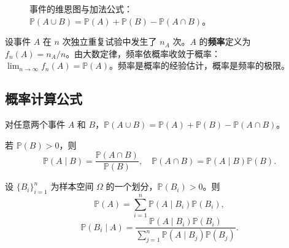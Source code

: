 \begin{figure}[htbp]
\centering
{}
\caption{事件的维恩图与加法公式：$\mathbb{P}(A\cup B)=\mathbb{P}(A)+\mathbb{P}(B)-\mathbb{P}(A\cap B)$。}
\label{fig:venn_diagram}
\end{figure}

\begin{definition}[频率与概率的关系]\label{def:frequency_probability}
设事件 $A$ 在 $n$ 次独立重复试验中发生了 $n_A$ 次。$A$ 的\textbf{频率}定义为 $f_n(A) = n_A / n$。由大数定律，频率依概率收敛于概率：$\lim_{n \to \infty} f_n(A) = \mathbb{P}(A)$。频率是概率的经验估计，概率是频率的极限。
\end{definition}

\subsection{概率计算公式}

\begin{definition}[加法公式]\label{def:addition_rule}
对任意两个事件 $A$ 和 $B$，$\mathbb{P}(A \cup B) = \mathbb{P}(A) + \mathbb{P}(B) - \mathbb{P}(A \cap B)$。
\end{definition}

\begin{definition}[条件概率与乘法公式]\label{def:conditional_multiplication}
若 $\mathbb{P}(B) > 0$，则
\[
\mathbb{P}(A \mid B) = \frac{\mathbb{P}(A \cap B)}{\mathbb{P}(B)}, \quad \mathbb{P}(A \cap B) = \mathbb{P}(A \mid B) \mathbb{P}(B).
\]
\end{definition}

\begin{definition}[全概率公式与贝叶斯公式]\label{def:total_probability_bayes}
设 $\{B_i\}_{i=1}^n$ 为样本空间 $\Omega$ 的一个划分，$\mathbb{P}(B_i) > 0$。则
\[
\mathbb{P}(A) = \sum_{i=1}^n \mathbb{P}(A \mid B_i) \mathbb{P}(B_i),
\]
\[
\mathbb{P}(B_i \mid A) = \frac{\mathbb{P}(A \mid B_i) \mathbb{P}(B_i)}{\sum_{j=1}^n \mathbb{P}(A \mid B_j) \mathbb{P}(B_j)}.
\]
\end{definition}

